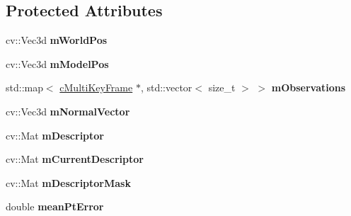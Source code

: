 \subsection*{Protected Attributes}
\begin{DoxyCompactItemize}
\item 
cv\+::\+Vec3d {\bfseries m\+World\+Pos}\hypertarget{classMultiColSLAM_1_1cMapPoint_ae8339597c43ad219c4f673164ad835ca}{}\label{classMultiColSLAM_1_1cMapPoint_ae8339597c43ad219c4f673164ad835ca}

\item 
cv\+::\+Vec3d {\bfseries m\+Model\+Pos}\hypertarget{classMultiColSLAM_1_1cMapPoint_a357e0120e4d0a169ae959298b2ee8087}{}\label{classMultiColSLAM_1_1cMapPoint_a357e0120e4d0a169ae959298b2ee8087}

\item 
std\+::map$<$ \hyperlink{classMultiColSLAM_1_1cMultiKeyFrame}{c\+Multi\+Key\+Frame} $\ast$, std\+::vector$<$ size\+\_\+t $>$ $>$ {\bfseries m\+Observations}\hypertarget{classMultiColSLAM_1_1cMapPoint_afaaf3f0c15ee926da086fd478a086402}{}\label{classMultiColSLAM_1_1cMapPoint_afaaf3f0c15ee926da086fd478a086402}

\item 
cv\+::\+Vec3d {\bfseries m\+Normal\+Vector}\hypertarget{classMultiColSLAM_1_1cMapPoint_a6f48fff8508ccced478b3541f4e2fb4d}{}\label{classMultiColSLAM_1_1cMapPoint_a6f48fff8508ccced478b3541f4e2fb4d}

\item 
cv\+::\+Mat {\bfseries m\+Descriptor}\hypertarget{classMultiColSLAM_1_1cMapPoint_a99d56c0c703f06db18841639c3cdbe17}{}\label{classMultiColSLAM_1_1cMapPoint_a99d56c0c703f06db18841639c3cdbe17}

\item 
cv\+::\+Mat {\bfseries m\+Current\+Descriptor}\hypertarget{classMultiColSLAM_1_1cMapPoint_a38b2c3cbb2511e3d27c5e7e641a08b99}{}\label{classMultiColSLAM_1_1cMapPoint_a38b2c3cbb2511e3d27c5e7e641a08b99}

\item 
cv\+::\+Mat {\bfseries m\+Descriptor\+Mask}\hypertarget{classMultiColSLAM_1_1cMapPoint_a3ca35916d28a0b5dff6de852d9525688}{}\label{classMultiColSLAM_1_1cMapPoint_a3ca35916d28a0b5dff6de852d9525688}

\item 
double {\bfseries mean\+Pt\+Error}\hypertarget{classMultiColSLAM_1_1cMapPoint_adf8230900e3fc0a908e7f8db0aacd84f}{}\label{classMultiColSLAM_1_1cMapPoint_adf8230900e3fc0a908e7f8db0aacd84f}


\end{DoxyCompactItemize}
